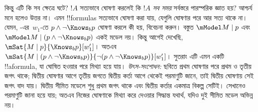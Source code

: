 \documentclass[../../../include/open-logic-section]{subfiles}
\begin{document}
কিন্তু এটি কি সব ক্ষেত্রে ঘটে? $!A$ সত্যভাবে ঘোষণা করলেই কি $!A$ \emph{সব সময়} সর্বস্তরে পারস্পরিক জ্ঞাত হয়? আশ্চর্য মনে হলেও উত্তর না। এমন !!{formula}s সত্যভাবে ঘোষণা করা যায়, যেগুলি ঘোষণার পরে আর সত্য থাকে না। যেমন, -এর~$w_1$-তে $p \land \lnot \Knows_b p$ ঘোষণা করলে কী হয়, বিবেচনা করুন। বস্তুত $\mModel M \mid p$ এবং $\mModel M \mid (p \land \lnot \Knows_b p)$ একই মডেল নয়। কিন্তু আগেই দেখেছি, $\mSat{M \mid p}{\Knows_b
p}[w'_1]$। অতএব $\mSat{M \mid (p \land \lnot \Knows_b p)}{\lnot
(p \land \lnot \Knows_b p)}[w'_1]$। সুতরাং এটি এমন একটি !!a{formula}, যা ঘোষিত হওয়ার পরে মিথ্যা হয়ে যায়।
\emph{উৎস-সংশোধন:} ছবিতে প্রথম ঘোষণার পরে প্রথম ও তৃতীয় জগৎ থাকে; দ্বিতীয় ঘোষণার আগে তৃতীয় জগতে দ্বিতীয় কর্তা আগে থেকেই পরমাণুটি জানে, তাই দ্বিতীয় ঘোষণায় সেই জগৎ বাদ যায়। দ্বিতীয় সীমিত মডেলে শুধু প্রথম জগৎ থাকে এবং দ্বিতীয় কর্তার একমাত্র বিকল্প সেটিই। সেখানেও পরমাণুটি জানা হয়ে যায়; অতএব নিজের ঘোষণাকে মিথ্যা করে দেওয়ার সিদ্ধান্ত যথার্থ, যদিও দুই সীমিত মডেল অভিন্ন নয়।
\end{document}
